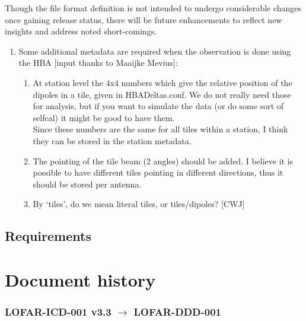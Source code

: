 \documentclass[a4paper,10pt,bibtotoc]{scrartcl}
\begin{document}
Though the file format definition is not intended to undergo
considerable changes once gaining release status, there will be future
enhancements to reflect new insights and address noted short-comings.

\begin{enumerate}
\item Some additional metadata are required when the observation is
  done using the HBA [input thanks to Maaijke Mevius]:
  \begin{enumerate}
  \item At station level the 4x4 numbers which give the relative
    position of the dipoles in a tile, given in HBADeltas.conf. We do
    not really need those for analysis, but if you want to simulate
    the data (or do some sort of selfcal) it might be good to have
    them. \\
    Since these numbers are the same for all tiles within a station, I
    think they can be stored in the station metadata.
  \item The pointing of the tile beam (2 angles) should be added. I
    believe it is possible to have different tiles pointing in
    different directions, thus it should be stored per antenna.
  \item By `tiles', do we mean literal tiles, or tiles/dipoles? [CWJ]
  \end{enumerate}
\end{enumerate}


\clearpage






\subsection{Requirements}
\label{sec:requirements}


\section{Document history}


\subsubsection*{LOFAR-ICD-001 v3.3 $\rightarrow$ LOFAR-DDD-001}
\end{document}
